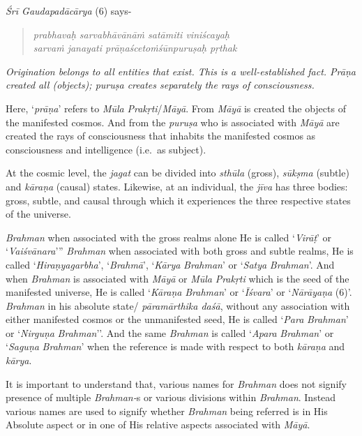 \emph{Śrī Gaudapadācārya} (6) says-
\vskip -10pt

\begin{verse}
\emph{prabhavaḥ sarvabhāvānāṁ satāmiti viniścayaḥ }\\
\emph{sarvaṁ janayati prāṇaścetoṁśūnpuruṣaḥ pṛthak }
\end{verse}
\vskip -10pt

\emph{Origination belongs to all entities that exist. This is a well-established fact. Prāṇa created all (objects); puruṣa creates separately the rays of consciousness.}

Here, `\emph{prāṇa}' refers to \emph{Mūla} \emph{Prakṛti}/\emph{Māyā}. From \emph{Māyā} is created the objects of the manifested cosmos. And from the \emph{puruṣa} who is associated with \emph{Māyā} are created the rays of consciousness that inhabits the manifested cosmos as consciousness and intelligence (i.e.\ as subject).

At the cosmic level, the \emph{jagat} can be divided into \emph{sthūla} (gross), \emph{sūkṣma} (subtle) and \emph{kāraṇa} (causal) states. Likewise, at an individual, the \emph{jīva} has three bodies: gross, subtle, and causal through which it experiences the three respective states of the universe.

\emph{Brahman} when associated with the gross realms alone He is called `\emph{Virāṭ}' or `\emph{Vaiśvānara}''' \emph{Brahman} when associated with both gross and subtle realms, He is called `\emph{Hiraṇyagarbha}', `\emph{Brahmā}', `\emph{Kārya} \emph{Brahman}' or `\emph{Satya} \emph{Brahman}'. And when \emph{Brahman} is associated with \emph{Māyā} or \emph{Mūla} \emph{Prakṛti} which is the seed of the manifested universe, He is called `\emph{Kāraṇa} \emph{Brahman}' or `\emph{Īśvara}' or `\emph{Nārāyaṇa} (6)'. \emph{Brahman} in his absolute state/ \emph{pāramārthika daśā}, without any association with either manifested cosmos or the unmanifested seed, He is called `\emph{Para} \emph{Brahman}' or `\emph{Nirguṇa} \emph{Brahman}''. And the same \emph{Brahman} is called `\emph{Apara} \emph{Brahman}' or `\emph{Saguṇa} \emph{Brahman}' when the reference is made with respect to both \emph{kāraṇa} and \emph{kārya}.

It is important to understand that, various names for \emph{Brahman} does not signify presence of multiple \emph{Brahman-}s or various divisions within \emph{Brahman}. Instead various names are used to signify whether \emph{Brahman} being referred is in His Absolute aspect or in one of His relative aspects associated with \emph{Māyā}.

